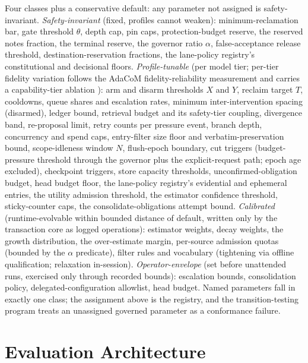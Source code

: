 \documentclass[11pt]{article}
\begin{document}
Four classes plus a conservative default: any parameter not assigned is safety-invariant. \emph{Safety-invariant} (fixed, profiles cannot weaken): minimum-reclamation bar, gate threshold $\theta$, depth cap, pin caps, protection-budget reserve, the reserved notes fraction, the terminal reserve, the governor ratio $\alpha$, false-acceptance release threshold, destination-reservation fractions, the lane-policy registry's constitutional and decisional floors. \emph{Profile-tunable} (per model tier; per-tier fidelity variation follows the AdaCoM fidelity-reliability measurement and carries a capability-tier ablation \cite{adacom2026}): arm and disarm thresholds $X$ and $Y$, reclaim target $T$, cooldowns, queue shares and escalation rates, minimum inter-intervention spacing (disarmed), ledger bound, retrieval budget and its safety-tier coupling, divergence band, re-proposal limit, retry counts per pressure event, branch depth, concurrency and spend caps, entry-filter size floor and verbatim-preservation bound, scope-idleness window $N$, flush-epoch boundary, cut triggers (budget-pressure threshold through the governor plus the explicit-request path; epoch age excluded), checkpoint triggers, store capacity thresholds, unconfirmed-obligation budget, head budget floor, the lane-policy registry's evidential and ephemeral entries, the utility admission threshold, the estimator confidence threshold, sticky-counter caps, the consolidate-obligations attempt bound. \emph{Calibrated} (runtime-evolvable within bounded distance of default, written only by the transaction core as logged operations): estimator weights, decay weights, the growth distribution, the over-estimate margin, per-source admission quotas (bounded by the $\alpha$ predicate), filter rules and vocabulary (tightening via offline qualification; relaxation in-session). \emph{Operator-envelope} (set before unattended runs, exercised only through recorded bounds): escalation bounds, consolidation policy, delegated-configuration allowlist, head budget. Named parameters fall in exactly one class; the assignment above is the registry, and the transition-testing program treats an unassigned governed parameter as a conformance failure.

\section{Evaluation Architecture}
\label{sec:eval}
\end{document}
